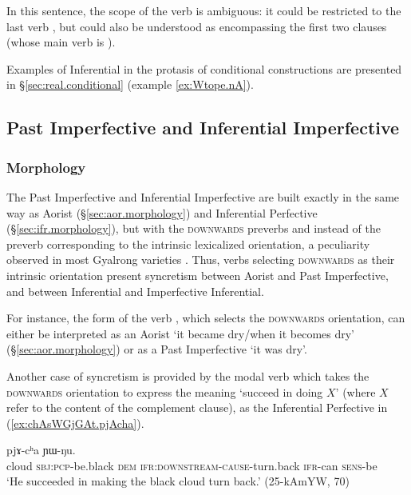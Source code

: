 In this sentence, the scope of the verb  is ambiguous: it could be restricted to the last verb , but could also be understood as encompassing the first two clauses (whose main verb is ).

Examples of Inferential in the protasis of conditional constructions are presented in §\ref{sec:real.conditional} (example \ref{ex:Wtope.nA}).

\subsection{Past Imperfective and Inferential Imperfective} \label{sec:pst.ifr.ipfv}

\subsubsection{Morphology} \label{sec:pst.ifr.ipfv.morphology}
The Past Imperfective and Inferential Imperfective are built exactly in the same way as Aorist (§\ref{sec:aor.morphology}) and Inferential Perfective (§\ref{sec:ifr.morphology}), but with the \textsc{downwards} preverbs  and  instead of the preverb corresponding to the intrinsic lexicalized orientation, a peculiarity observed in most Gyalrong varieties \citep{lin11direction}. Thus, verbs selecting \textsc{downwards} as their intrinsic orientation present syncretism between Aorist and Past Imperfective, and between Inferential and Imperfective Inferential.

For instance, the form  of the verb , which selects the \textsc{downwards} orientation, can either be interpreted as an Aorist `it became dry/when it becomes dry' (§\ref{sec:aor.morphology}) or as a Past Imperfective `it was dry'.

Another case of syncretism is provided by the modal verb  which takes the \textsc{downwards} orientation to express the meaning `succeed in doing $X$' (where $X$ refer to the content of the complement clause), as the Inferential Perfective  in (\ref{ex:chAsWGjGAt.pjAcha}).

\begin{exe}
\ex \label{ex:chAsWGjGAt.pjAcha}
 pjɤ-cʰa ɲɯ-ŋu. \\
cloud \textsc{sbj}:\textsc{pcp}-be.black \textsc{dem} \textsc{ifr}:\textsc{downstream}-\textsc{cause}-turn.back \textsc{ifr}-can \textsc{sens}-be \\
\glt `He succeeded in making the black cloud turn back.' (25-kAmYW, 70)
\end{exe}

